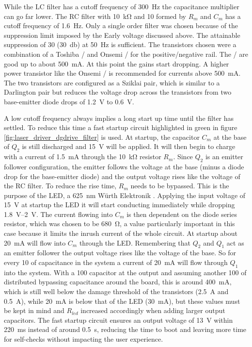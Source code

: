 While the LC filter has a cutoff frequency of \qty{300}{\Hz} the capacitance multiplier can go far lower. The RC filter with \qty{10}{\kilo\ohm} and \qty{10}{\uF} formed by $R_m$ and $C_m$ has a cutoff frequency of \qty{1.6}{\Hz}. Only a single order filter was chosen because of the suppression limit imposed by the Early voltage discussed above. The attainable suppression of 30 (\qty{30}{\decibel}) at \qty{50}{\Hz} is sufficient. The transistors chosen were a combination of a Toshiba / and Onsemi / for the positive/negative rail. The / are good up to about \qty{500}{\mA}. At this point the gains start dropping. A higher power transistor like the Onsemi / is recommended for currents above \qty{500}{\mA}. The two transistors are configured as a Sziklai pair, which is similar to a Darlington pair but reduces the voltage drop across the transistors from two base-emitter diode drops of \qty{1.2}{\V} to \qty{0.6}{\V}.

A low cutoff frequency always implies a long start up time until the filter has settled. To reduce this time a fast startup circuit highlighted in green in figure \ref{fig:laser_driver_dgdrive_filter} is used. At startup, the capacitor $C_m$ at the base of $Q_2$ is still discharged and \qty{15}{\V} will be applied. It will then begin to charge with a current of \qty{1.5}{\mA} through the \qty{10}{\kilo\ohm} resistor $R_m$. Since $Q_2$ is an emitter follower configuration, the emitter follows the voltage at the base (minus a diode drop for the base-emitter diode) and the output voltage rises like the voltage of the RC filter. To reduce the rise time, $R_m$ needs to be bypassed. This is the purpose of the LED, a \qty{625}{\nm} Würth Elektronik . Applying the input voltage of \qty{15}{\V} at startup the LED it will start conducting immediately while dropping \qtyrange[range-units = single]{1.8}{2}{\V}. The current flowing into $C_m$ is then dependent on the diode series resistor, which was chosen to be \qty{680}{\ohm}, a value particularly important in this case because it limits the inrush current of the whole circuit. At startup about \qty{20}{\mA} will flow into $C_m$ through the LED. Remembering that $Q_2$ and $Q_1$ act as an emitter follower the output voltage rises like the voltage of the base. So for every \qty{10}{\uF} of capacitance in the system a current of \qty{20}{\mA} will flow through $Q_1$ into the system. With a \qty{100}{\uF} capacitor at the output and assuming another \qty{100}{\uF} of distributed bypassing capacitance around the board, this is around \qty{400}{\mA}, which is still well below the damage threshold of the transistors (\qty{2.5}{\A} and \qty{0.5}{\A}), while \qty{20}{\mA} is below that of the LED (\qty{30}{\mA}), but these values must be kept in mind and $R_{led}$ increased accordingly when adding larger output capacitors. The fast startup circuit ensures an output voltage of \qty{13}{\V} within \qty{220}{\ms} instead of around \qty{0.5}{\second}, reducing the time to boot and leaving more time for self-checks without impacting the user experience.

